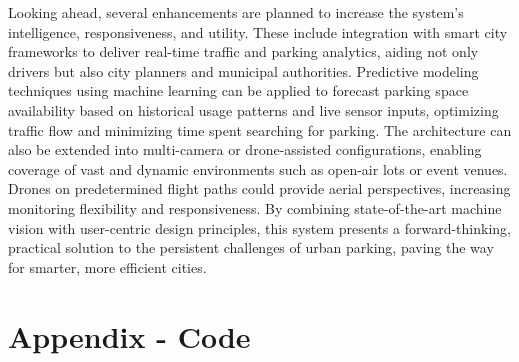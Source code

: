 \documentclass[conference]{IEEEtran}
\begin{document}
Looking ahead, 
several enhancements are planned to increase the system's intelligence, 
responsiveness, 
and utility. 
These include integration with smart city frameworks to deliver real-time traffic and parking analytics, 
aiding not only drivers but also city planners and municipal authorities. 
Predictive modeling techniques using machine learning can be applied to forecast parking space availability based on historical usage patterns and live sensor inputs, 
optimizing traffic flow and minimizing time spent searching for parking. 
The architecture can also be extended into multi-camera or drone-assisted configurations, 
enabling coverage of vast and dynamic environments such as open-air lots or event venues. 
Drones on predetermined flight paths could provide aerial perspectives, 
increasing monitoring flexibility and responsiveness. 
By combining state-of-the-art machine vision with user-centric design principles, 
this system presents a forward-thinking, 
practical solution to the persistent challenges of urban parking, 
paving the way for smarter, more efficient cities.



\section{Appendix - Code}
\end{document}
